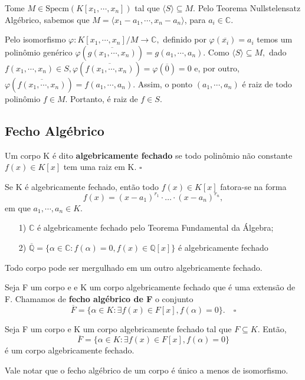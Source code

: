 \documentclass[algebraII_notes.tex]{subfiles}
\begin{document}
\begin{proof*}
	Tome \(M\in \mathrm{Specm}(K[x_{1}, \cdots, x_{n}])\) tal que \(\langle S \rangle \subseteq{M}.\) Pelo Teorema
	Nullstelensatz Algébrico, sabemos que \(M = \langle x_{1}-a_{1}, \cdots, x_{n}-a_{n} \rangle\), para \(a_{i}\in \mathbb{C}.\)

	Pelo isomorfismo \(\varphi :K[x_{1}, \cdots, x_{n}]/M\rightarrow \mathbb{C},\) definido por \(\varphi (\overline{x_{i}}) = a_{i}\) temos
	um polinômio genérico \(\varphi (\overline{g(x_{1}, \cdots, x_{n})}) = g(a_{1}, \cdots, a_{n}).\) Como \(\langle S \rangle \subseteq{M},\)
	dado \(f(x_{1}, \cdots, x_{n})\in S, \varphi (\overline{f(x_{1}, \cdots, x_{n})})=\varphi (\overline{0}) = 0\) e, por outro, \(\varphi (\overline{f(x_{1}, \cdots, x_{n})}) =
	f(a_{1}, \cdots, a_{n}).\) Assim, o ponto \((a_{1}, \cdots, a_{n})\) é raiz de todo polinômio \(f\in M\). Portanto,
	é raiz de \(f\in S.\) \qedsymbol
\end{proof*}
\subsection{Fecho Algébrico}
\begin{def*}
	Um corpo K é dito \textbf{algebricamente fechado} se todo polinômio não constante \(f(x)\in K[x]\) tem
	uma raiz em K. \(\square\)
\end{def*}
\begin{lemma*}
	Se K é algebricamente fechado, então todo \(f(x)\in K[x]\) fatora-se na forma
	\[
		f(x) = (x-a_{1})^{r_{1}}\cdot \dotsc \cdot (x-a_{n})^{r_{n}},
	\]
	em que \(a_{1}, \cdots, a_{n}\in K\).
\end{lemma*}
\begin{example}
	\begin{itemize}
		\item[1)] \(\mathbb{C}\) é algebricamente fechado pelo Teorema Fundamental da Álgebra;
		\item[2)] \(\overline{\mathbb{Q}} = \{\alpha \in \mathbb{C}: f(\alpha ) = 0, f(x)\in \mathbb{Q}[x]\}\) é algebricamente fechado
	\end{itemize}
\end{example}
Todo corpo pode ser mergulhado em um outro algebricamente fechado.
\begin{def*}
	Seja F um corpo e e K um corpo algebricamente fechado que é uma extensão de F. Chamamos de
	\textbf{fecho algébrico de F} o conjunto
	\[
		\overline{F} = \{\alpha \in K: \exists f(x)\in F[x], f(\alpha ) = 0\}.\quad\square
	\]
\end{def*}
\begin{prop*}
	Seja F um corpo e K um corpo algebricamente fechado tal que \(F \subseteq{K}.\) Então,
	\[
		\overline{F} = \{\alpha \in K: \exists f(x)\in F[x], f(\alpha ) = 0\}
	\]
	é um corpo algebricamente fechado.
\end{prop*}
Vale notar que o fecho algébrico de um corpo é único a menos de isomorfismo.
\end{document}
